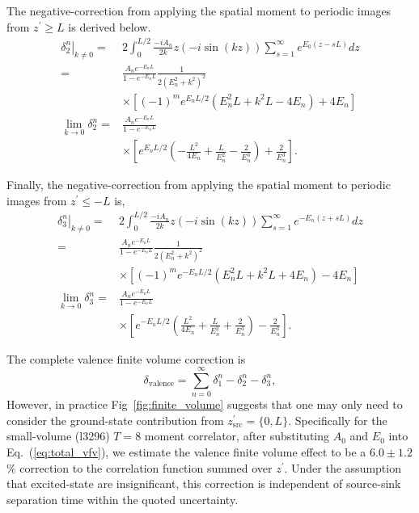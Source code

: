 \documentclass[prd,aps,twocolumn,superscriptaddress,tightenlines,nofootinbib,floatfix,preprintnumbers,10pt]{revtex4-1}
\begin{document}
The negative-correction from applying the spatial moment to periodic images from $z^\prime \geq L$ is derived below. 
\begin{align}
\left.\delta^n_{2}\right|_{k\neq 0} =& 2\int_0^{L/2} \frac{-iA_n}{2k}z(-i\sin(kz)) \sum_{s=1}^\infty e^{E_0(z-sL)} dz \label{eq:dfv_2.1}\\
= & \frac{A_n e^{-E_n L}}{1-e^{-E_n L}}\frac{1}{2(E_n^2+k^2)^2}\nonumber\\
&\times\left[(-1)^m e^{E_n L/2}(E_n^2L+k^2L-4E_n) + 4E_n\right]\label{eq:dfv_2.2}\\
\lim_{k\rightarrow 0}\delta^n_2= & \frac{A_n e^{-E_n L}}{1-e^{-E_n L}}\nonumber\\
&\times\left[e^{E_n L/2} \left( -\frac{L^2}{4E_n} + \frac{L}{E_n^2} -\frac{2}{E_n^3} \right) + \frac{2}{E_n^3}\right].
\label{eq:dfv_2.0}
\end{align}

Finally, the negative-correction from applying the spatial moment to periodic images from $z^\prime \leq -L$ is,
\begin{align}
\left.\delta^n_{3}\right|_{k\neq 0}= & 2\int_{0}^{L/2}  \frac{-iA_n}{2k} z (-i\sin(kz)) \sum_{s=1}^\infty e^{-E_n(z+sL)} dz \label{eq:dfv_3.1}\\
=&\frac{A_n e^{-E_n L}}{1-e^{-E_n L}}\frac{1}{2(E_n^2+k^2)^2}\nonumber\\
&\times\left[(-1)^m e^{-E_n L/2}(E_n^2L+k^2L+4E_n) - 4E_n\right]\\
\lim_{k\rightarrow 0} \delta^n_3= & \frac{A_n e^{-E_n L}}{1-e^{-E_n L}}\nonumber\\
&\times \left[ e^{-E_n L/2}\left(\frac{L^2}{4E_n}+\frac{L}{E_n^2}+\frac{2}{E_n^3}\right)-\frac{2}{E_n^3}\right].
\label{eq:dfv_3.0}
\end{align}

The complete valence finite volume correction is
\begin{equation}
\delta_{\mathrm{valence}} = \sum_{n=0}^\infty \delta^n_1 - \delta^n_2 - \delta^n_3,
\label{eq:total_vfv}
\end{equation}
However, in practice Fig~\ref{fig:finite_volume} suggests that one may only need to consider the ground-state contribution from $z^\prime_{\mathrm{src}}=\{0, L\}$. Specifically for the small-volume (l3296) $T=8$ moment correlator, after substituting $A_0$ and $E_0$ into Eq.~(\ref{eq:total_vfv}), we estimate the valence finite volume effect to be a $6.0\pm 1.2$\% correction to the correlation function summed over $z^\prime$. Under the assumption that excited-state are insignificant, this correction is independent of source-sink separation time within the quoted uncertainty.
\end{document}
